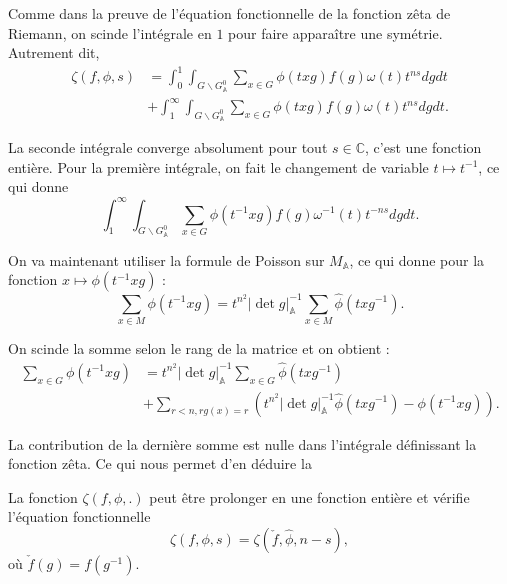 Comme dans la preuve de l'équation fonctionnelle de la fonction zêta de Riemann, on scinde l'intégrale en $1$ pour faire apparaître une symétrie. Autrement dit,
\begin{equation}
\begin{split}
\zeta(f, \phi, s) &= \int_0^1 \int_{G \backslash G^0_\mathbb{A}} \sum_{x \in G}{\phi(txg)} f(g) \omega(t) t^{ns} dg dt \\
&+ \int_1^\infty \int_{G \backslash G^0_\mathbb{A}} \sum_{x \in G}{\phi(txg)} f(g) \omega(t) t^{ns} dg dt.
\end{split}
\end{equation}

La seconde intégrale converge absolument pour tout $s \in \mathbb{C}$, c'est une fonction entière. Pour la première intégrale, on fait le changement de variable $t \mapsto t^{-1}$, ce qui donne
\begin{equation}
\int_1^\infty \int_{G \backslash G^0_\mathbb{A}} \sum_{x \in G}{\phi(t^{-1}xg)} f(g) \omega^{-1}(t) t^{-ns} dg dt.
\end{equation}

On va maintenant utiliser la formule de Poisson sur $M_\mathbb{A}$, ce qui donne pour la fonction $x \mapsto \phi(t^{-1}xg)$ :
\begin{equation}
\sum_{x \in M} \phi(t^{-1}xg) = t^{n^2}|\det g|_\mathbb{A}^{-1}\sum_{x \in M} \hat{\phi}(txg^{-1}).
\end{equation}

On scinde la somme selon le rang de la matrice et on obtient :
\begin{equation}
\begin{split}
\sum_{x \in G} \phi(t^{-1}xg) &= t^{n^2}|\det g|_\mathbb{A}^{-1}\sum_{x \in G} \hat{\phi}(txg^{-1}) \\
&+ \sum_{r < n, rg(x)=r} \left( t^{n^2}|\det g|_\mathbb{A}^{-1}\hat{\phi}(txg^{-1}) - \phi(t^{-1}xg)\right).
\end{split}
\end{equation}

La contribution de la dernière somme est nulle dans l'intégrale définissant la fonction zêta. Ce qui nous permet d'en déduire la
\begin{proposition}
La fonction $\zeta(f, \phi, .)$ peut être prolonger en une fonction entière et vérifie l'équation fonctionnelle
\begin{equation}
\zeta(f, \phi, s) = \zeta(\check{f}, \hat{\phi}, n-s),
\end{equation}
où $\check{f}(g)=f(g^{-1})$.
\end{proposition}

